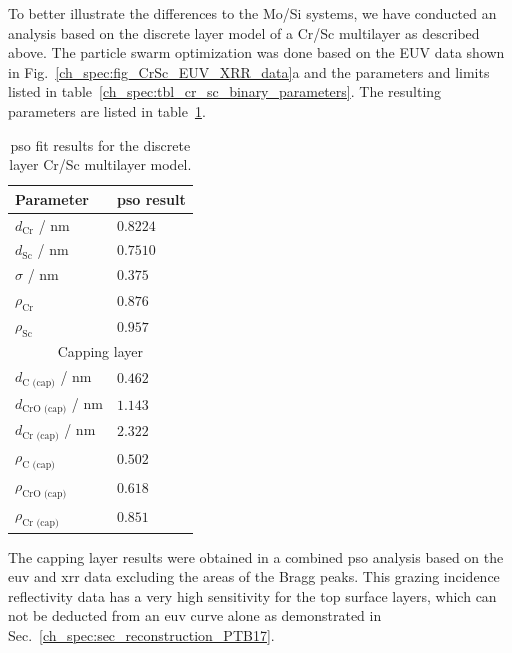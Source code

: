 To better illustrate the differences to the Mo/Si systems, we have conducted an 
analysis based on the discrete layer model of a Cr/Sc multilayer as described above. The particle swarm optimization was done based on the EUV data shown in Fig.~\ref{ch_spec:fig_CrSc_EUV_XRR_data}a and the parameters and limits listed in table~\ref{ch_spec:tbl_cr_sc_binary_parameters}. The resulting parameters are listed in table~\ref{ch_spec:tbl_cr_sc_binary_pso_results}.
\begin{table}[htbp]
\centering
\caption{\gls{pso} fit results for the discrete layer Cr/Sc multilayer model.}
\label{ch_spec:tbl_cr_sc_binary_pso_results}
\begin{tabular}{@{}ll@{}}
\toprule
Parameter &  \gls{pso} result\\ \midrule
$d_\text{Cr}$ / nm &  $0.8224$\\ 
$d_\text{Sc}$ / nm &  $0.7510$\\ 
$\sigma$ / nm &  $0.375$\\ 
$\rho_\text{Cr}$  & $0.876$\\ 
$\rho_\text{Sc}$ & $0.957$\\ 
\midrule
\multicolumn{2}{c}{Capping layer}\\
\midrule
$d_\text{C (cap)}$ / nm  & $0.462$ \\ 
$d_\text{CrO (cap)}$ / nm  & $1.143$ \\ 
$d_\text{Cr (cap)}$ / nm  & $2.322$ \\ 
$\rho_\text{C (cap)}$ & $0.502$\\ 
$\rho_\text{CrO (cap)}$& $0.618$\\
$\rho_\text{Cr (cap)}$ & $0.851$\\
 \bottomrule
\end{tabular}
\end{table}
The capping layer results were obtained in a combined \gls{pso} analysis based on the \gls{euv} and \gls{xrr} data excluding the areas of the Bragg peaks. This grazing incidence reflectivity data has a very high sensitivity for the top surface layers, which can not be deducted from an \gls{euv} curve alone as demonstrated in Sec.~\ref{ch_spec:sec_reconstruction_PTB17}.

